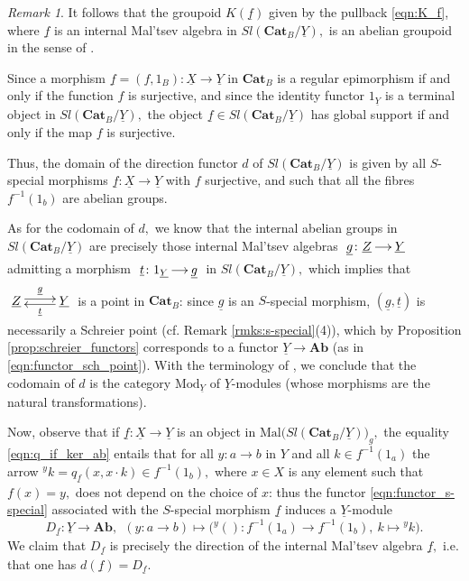 \documentclass[11pt]{amsart}
\theoremstyle{plain}
\theoremstyle{definition}
\theoremstyle{remark}
\newtheorem{remark}[subsubsection]{Remark}
\newcommand{\un}{\underline}
\begin{document}
\begin{remark}
It follows that the groupoid $K(\un{f})$ given by the pullback \eqref{eqn:K_f}, where $\un{f}$ is an internal Mal'tsev algebra in $Sl(\mathbf{Cat}_B/\un{Y}),$ is an abelian groupoid in the sense of \cite{aspherical}.
\end{remark}
Since a morphism $\un{f}=(f,1_B)\colon\un{X}\rightarrow\un{Y}$ in $\mathbf{Cat}_B$ is a regular epimorphism if and only if the function $f$ is surjective, and since the identity functor $1_{\un{Y}}$ is a terminal object in $Sl(\mathbf{Cat}_B/\un{Y}),$ the object $\un{f}\in Sl(\mathbf{Cat}_B/\un{Y})$ has global support if and only if the map $f$ is surjective.

Thus, the domain of the direction functor $d$ of $Sl(\mathbf{Cat}_B/\un{Y})$ is given by all $S$-special morphisms $\un{f}\colon\un{X}\rightarrow\un{Y}$ with $f$ surjective, and such that all the fibres $f^{-1}(1_b)$ are abelian groups.

As for the codomain of $d,$ we know that the internal abelian groups in $Sl(\mathbf{Cat}_B/\un{Y})$ are precisely those internal Mal'tsev algebras $\xymatrixcolsep{1pc}\xymatrix{{{\un{g}}\colon\un{Z}} \ar[r] &{\un{Y}}}$ admitting a morphism $\xymatrixcolsep{1pc}\xymatrix{{\un{t}\colon1_{\un{Y}}} \ar[r] &{\un{g}}}$ in  $Sl(\mathbf{Cat}_B/\un{Y}),$ which implies that $\xymatrix{{\un{Z}} \ar@<.5ex>[r]^-{\un{g}} &{\un{Y}} \ar@<.5ex>[l]^-{\un{t}}}$ is a point in $\mathbf{Cat}_B$: since $\un{g}$ is an $S$-special morphism, $(\un{g},\un{t})$ is necessarily a Schreier point (cf. Remark \ref{rmks:s-special}(4)), which by Proposition \ref{prop:schreier_functors} corresponds to a functor $\un{Y}\rightarrow \mathbf{Ab}$ (as in \eqref{eqn:functor_sch_point}). With the terminology of \cite{cocat}, we conclude that the codomain of $d$ is the category $\mathrm{Mod}_{\un{Y}}$ of $\un{Y}$-modules (whose morphisms are the natural transformations).

Now, observe that if $\un{f}\colon\un{X}\rightarrow\un{Y}$ is an object in $\mathrm{Mal}\big(Sl(\mathbf{Cat}_B/\un{Y})\big)_g,$ the equality \eqref{eqn:q_if_ker_ab} entails that for all $y\colon a\rightarrow b$ in $Y$ and all $k\in f^{-1}(1_a)$ the arrow ${^yk}=q_{\un{f}}(x,x\cdot k)\in f^{-1}(1_b),$ where $x\in X$ is any element such that $f(x)=y,$ does not depend on the choice of $x$: thus the functor \eqref{eqn:functor_s-special} associated with the $S$-special morphism $\un{f}$ induces a $\un{Y}$-module
\begin{equation}
\label{eqn:d(f)}
D_{\un{f}}\colon\underline{Y} \rightarrow \mathbf{Ab}, \ \  (y\colon a\rightarrow b) \mapsto \big({^y()}\colon f^{-1}(1_a)\rightarrow f^{-1}(1_b), \ k\mapsto {^yk}\big).
\end{equation}
We claim that $D_{\un{f}}$ is precisely the direction of the internal Mal'tsev algebra $\un{f},$ i.e. that one has $d(\un{f})=D_{\un{f}}.$
\end{document}
